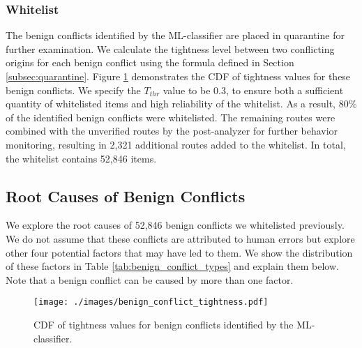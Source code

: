\subsubsection{Whitelist}
The benign conflicts identified by the ML-classifier are placed in quarantine for further examination.
We calculate the tightness level between two conflicting origins for each benign conflict using the formula defined in Section \ref{subsec:quarantine}.
Figure \ref{fig:bc_tightness} demonstrates the CDF of tightness values for these benign conflicts.
We specify the $T_{thr}$ value to be 0.3, to ensure both a sufficient quantity of whitelisted items and high reliability of the whitelist.
As a result, 80\% of the identified benign conflicts were whitelisted.
The remaining routes were combined with the unverified routes by the post-analyzer for further behavior monitoring, resulting in 2,321 additional routes added to the whitelist.
In total, the whitelist contains 52,846 items.
\vspace{-10pt}
\subsection{Root Causes of Benign Conflicts} \label{subsec:rootcauses_BC}
We explore the root causes of 52,846 benign conflicts we whitelisted previously. We do not assume that these conflicts are attributed to human errors but explore other four potential factors that may have led to them.
We show the distribution of these factors in Table \ref{tab:benign_conflict_types} and explain them below. Note that a benign conflict can be caused by more than one factor.

\begin{figure}[t!]
\centerline{\texttt{[image: ./images/benign\_conflict\_tightness.pdf]}}
\vspace{-15pt}
\caption[CDF of tightness values for benign conflicts.]{\small{CDF of tightness values for benign conflicts identified by the ML-classifier.}}
\label{fig:bc_tightness}
\end{figure}

